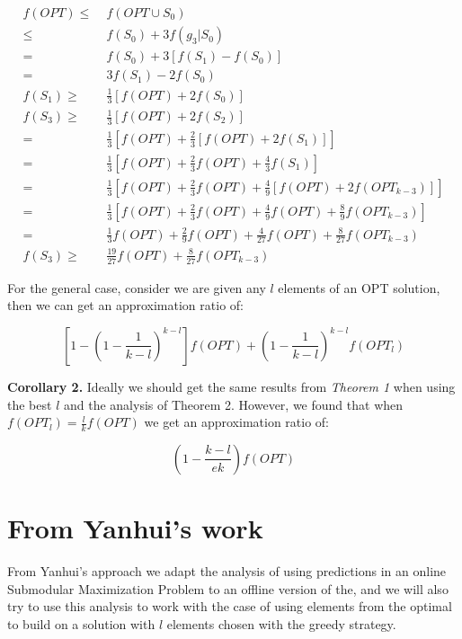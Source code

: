 \documentclass{article}
\begin{document}
$$\begin{aligned}
    f(OPT) \leq \;& f(OPT \cup S_0)\\
            \leq\;& f(S_0) + 3 f(g_3 | S_0) \\
            =\; & f(S_0) + 3 [f(S_1) -f(S_0)] \\
            =\; & 3f(S_1) - 2f(S_0)\\
    f(S_1)  \geq\;& \frac{1}{3} [f(OPT) + 2f(S_0)] \\
    f(S_3)  \geq\;& \frac{1}{3} [f(OPT) + 2f(S_2)] \\
            =\;& \frac{1}{3} [f(OPT) + \frac{2}{3} [f(OPT) + 2f(S_1)]] \\
            =\;& \frac{1}{3} [f(OPT) +\frac{2}{3} f(OPT) + \frac{4}{3}f(S_1)] \\
            =\;& \frac{1}{3} [f(OPT) +\frac{2}{3} f(OPT) + \frac{4}{9}[f(OPT) + 2f(OPT_{k-3})]] \\
            =\;& \frac{1}{3} [f(OPT) +\frac{2}{3} f(OPT) + \frac{4}{9}f(OPT) + \frac{8}{9}f(OPT_{k-3})] \\
            =\;& \frac{1}{3}f(OPT) +\frac{2}{9} f(OPT) + \frac{4}{27}f(OPT) + \frac{8}{27}f(OPT_{k-3}) \\
    f(S_3) \geq\; & \frac{19}{27} f(OPT) + \frac{8}{27}f(OPT_{k-3})
\end{aligned}$$


For the general case, consider we are given any $l$ elements of an OPT solution, then we can get an approximation ratio of:

$$
\left[1 - \left(1 - \frac{1}{k-l}\right)^{k-l}\right] f(OPT) + \left(1 - \frac{1}{k-l}\right)^{k-l} f(OPT_{l})
$$

\textbf{Corollary 2.} Ideally we should get the same results from \emph{Theorem 1} when using the best $l$ and the analysis of Theorem 2. However, we found that when $f(OPT_{l}) = \frac{l}{k}f(OPT)$ we get an approximation ratio of:

$$\left(1 - \frac{k-l}{ek}\right)f(OPT)$$

\section{From Yanhui's work}

From Yanhui's approach we adapt the analysis of using predictions in an online Submodular Maximization Problem to an offline version of the, and we will also try to use this analysis to work with the case of using elements from the optimal to build on a solution with $l$ elements chosen with the greedy strategy.
\end{document}
